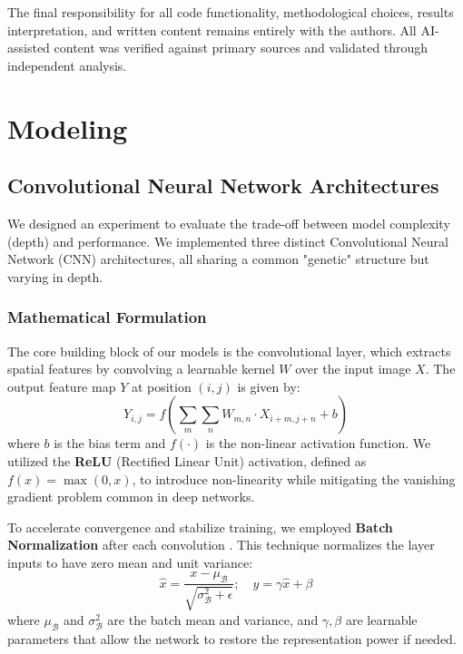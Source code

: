 \documentclass[12pt,a4paper]{article}
\begin{document}
The final responsibility for all code functionality, methodological choices, results interpretation, and written content remains entirely with the authors. All AI-assisted content was verified against primary sources and validated through independent analysis.

\section{Modeling}

\subsection{Convolutional Neural Network Architectures}
We designed an experiment to evaluate the trade-off between model complexity (depth) and performance. We implemented three distinct Convolutional Neural Network (CNN) architectures, all sharing a common "genetic" structure but varying in depth.

\subsubsection{Mathematical Formulation}
The core building block of our models is the convolutional layer, which extracts spatial features by convolving a learnable kernel $W$ over the input image $X$. The output feature map $Y$ at position $(i,j)$ is given by:
\begin{equation}
    Y_{i,j} = f\left(\sum_{m}\sum_{n} W_{m,n} \cdot X_{i+m, j+n} + b\right)
\end{equation}
where $b$ is the bias term and $f(\cdot)$ is the non-linear activation function. We utilized the \textbf{ReLU} (Rectified Linear Unit) activation, defined as $f(x) = \max(0, x)$, to introduce non-linearity while mitigating the vanishing gradient problem common in deep networks.

To accelerate convergence and stabilize training, we employed \textbf{Batch Normalization} after each convolution \citep{Shorten2019, BejaniGhatee2021}. This technique normalizes the layer inputs to have zero mean and unit variance:
\begin{equation}
    \hat{x} = \frac{x - \mu_{\mathcal{B}}}{\sqrt{\sigma_{\mathcal{B}}^2 + \epsilon}}; \quad y = \gamma \hat{x} + \beta
\end{equation}
where $\mu_{\mathcal{B}}$ and $\sigma_{\mathcal{B}}^2$ are the batch mean and variance, and $\gamma, \beta$ are learnable parameters that allow the network to restore the representation power if needed.
\end{document}
